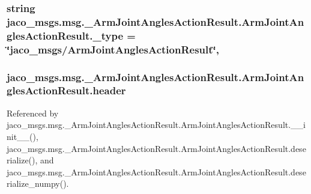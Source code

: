 \subsubsection[{\texorpdfstring{\+\_\+type}{_type}}]{\setlength{\rightskip}{0pt plus 5cm}string jaco\+\_\+msgs.\+msg.\+\_\+\+Arm\+Joint\+Angles\+Action\+Result.\+Arm\+Joint\+Angles\+Action\+Result.\+\_\+type = \char`\"{}jaco\+\_\+msgs/{\bf Arm\+Joint\+Angles\+Action\+Result}\char`\"{}\hspace{0.3cm}{\ttfamily [static]}, {\ttfamily [private]}}\hypertarget{classjaco__msgs_1_1msg_1_1__ArmJointAnglesActionResult_1_1ArmJointAnglesActionResult_a99613d6f8aeeccd505acaab64ac11631}{}\label{classjaco__msgs_1_1msg_1_1__ArmJointAnglesActionResult_1_1ArmJointAnglesActionResult_a99613d6f8aeeccd505acaab64ac11631}
\subsubsection[{\texorpdfstring{header}{header}}]{\setlength{\rightskip}{0pt plus 5cm}jaco\+\_\+msgs.\+msg.\+\_\+\+Arm\+Joint\+Angles\+Action\+Result.\+Arm\+Joint\+Angles\+Action\+Result.\+header}\hypertarget{classjaco__msgs_1_1msg_1_1__ArmJointAnglesActionResult_1_1ArmJointAnglesActionResult_a42432041a06f195ca4c7566f6157062e}{}\label{classjaco__msgs_1_1msg_1_1__ArmJointAnglesActionResult_1_1ArmJointAnglesActionResult_a42432041a06f195ca4c7566f6157062e}


Referenced by jaco\+\_\+msgs.\+msg.\+\_\+\+Arm\+Joint\+Angles\+Action\+Result.\+Arm\+Joint\+Angles\+Action\+Result.\+\_\+\+\_\+init\+\_\+\+\_\+(), jaco\+\_\+msgs.\+msg.\+\_\+\+Arm\+Joint\+Angles\+Action\+Result.\+Arm\+Joint\+Angles\+Action\+Result.\+deserialize(), and jaco\+\_\+msgs.\+msg.\+\_\+\+Arm\+Joint\+Angles\+Action\+Result.\+Arm\+Joint\+Angles\+Action\+Result.\+deserialize\+\_\+numpy().

